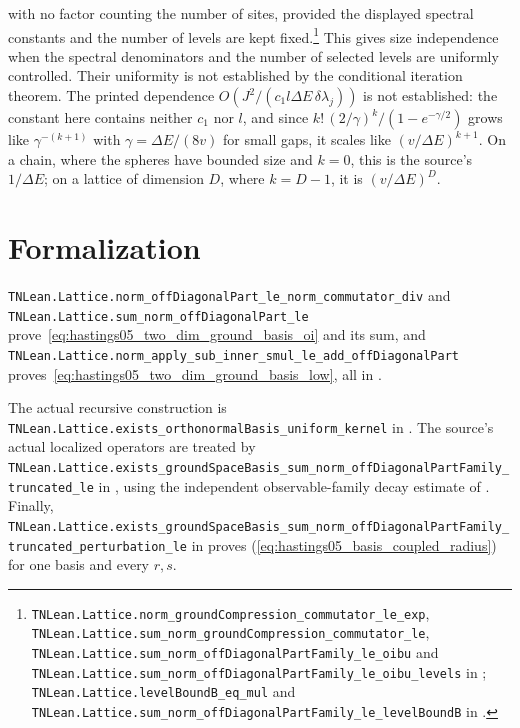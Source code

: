 \documentclass{article}
\providecommand{\leanid}[1]{\nolinkurl{#1}}
\begin{document}
with no factor counting the number of sites, provided the displayed spectral
constants and the number of levels are kept fixed.\footnote{\leanid{TNLean.Lattice.norm_groundCompression_commutator_le_exp},
    \leanid{TNLean.Lattice.sum_norm_groundCompression_commutator_le},
    \leanid{TNLean.Lattice.sum_norm_offDiagonalPartFamily_le_oibu} and
    \leanid{TNLean.Lattice.sum_norm_offDiagonalPartFamily_le_oibu_levels} in
    ;
    \leanid{TNLean.Lattice.levelBoundB_eq_mul} and
    \leanid{TNLean.Lattice.sum_norm_offDiagonalPartFamily_le_levelBoundB} in
    .}
This gives size independence when the spectral denominators and the number of
selected levels are uniformly controlled. Their uniformity is not established by
the conditional iteration theorem. The printed dependence $O(J^2/(c_1l\Delta E\,\delta\lambda_j))$ is not established:
the constant here contains neither $c_1$ nor $l$, and since
$k!\,(2/\gamma)^k/(1-e^{-\gamma/2})$ grows like $\gamma^{-(k+1)}$ with
$\gamma=\Delta E/(8v)$ for small gaps, it scales like $(v/\Delta E)^{k+1}$.
On a chain, where the spheres have bounded size and $k=0$, this is the source's
$1/\Delta E$; on a lattice of dimension $D$, where $k=D-1$, it is
$(v/\Delta E)^D$.

\section{Formalization}

\leanid{TNLean.Lattice.norm_offDiagonalPart_le_norm_commutator_div} and
\leanid{TNLean.Lattice.sum_norm_offDiagonalPart_le}
prove~\eqref{eq:hastings05_two_dim_ground_basis_oi} and its sum, and
\leanid{TNLean.Lattice.norm_apply_sub_inner_smul_le_add_offDiagonalPart}
proves~\eqref{eq:hastings05_two_dim_ground_basis_low}, all in
.

The actual recursive construction is
\leanid{TNLean.Lattice.exists_orthonormalBasis_uniform_kernel} in
. The source's actual localized
operators are treated by
\leanid{TNLean.Lattice.exists_groundSpaceBasis_sum_norm_offDiagonalPartFamily_truncated_le}
in , using the independent
observable-family decay estimate of .
Finally,
\leanid{TNLean.Lattice.exists_groundSpaceBasis_sum_norm_offDiagonalPartFamily_truncated_perturbation_le}
in  proves
(\ref{eq:hastings05_basis_coupled_radius}) for one basis and every $r,s$.



\end{document}

